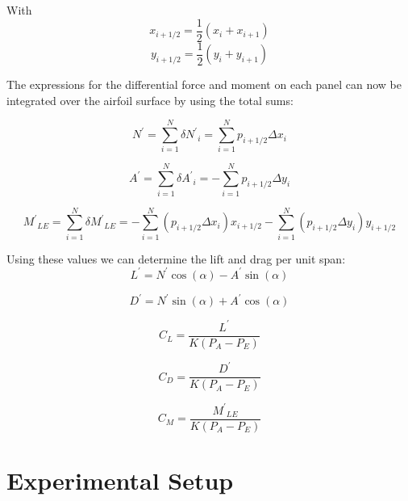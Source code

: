 \documentclass[12pt]{article}
\begin{document}
With
\[x_{i+1/2} = \frac{1}{2} \left( x_i +x_{i+1} \right)\]
\[y_{i+1/2} = \frac{1}{2} \left( y_i +y_{i+1} \right)\]

The expressions for the differential force and moment on each panel can now be integrated over the airfoil surface by using the total sums:

\[{N^'}=\sum^N_{i=1} \delta {N^'}_i = \sum^N_{i=1} p_{i+1/2} \Delta x_i\]

\[{A^'}=\sum^N_{i=1} \delta {A^'}_i = -\sum^N_{i=1} p_{i+1/2} \Delta y_i\]

\[{M^'}_{LE} = \sum^N_{i=1} \delta {M^'}_{LE} = -\sum^N_{i=1}\left( p_{i+1/2} \Delta x_i \right)x_{i+1/2} - \sum^N_{i=1} \left( p_{i+1/2} \Delta y_i \right) y_{i+1/2}\]

Using these values we can determine the lift and drag per unit span:
\[{L^'} = {N^'} \cos (\alpha) - {A^'} \sin (\alpha) \]

\[{D^'} = {N^'} \sin (\alpha) + {A^'} \cos (\alpha) \]

\[C_L = \frac{{L^'}}{K(P_A-P_E)}\]

\[C_D = \frac{{D^'}}{K(P_A-P_E)}\]

\[C_M = \frac{{M^'}_{LE}}{K(P_A-P_E)}\]

\newpage
\section{Experimental Setup}
\end{document}

